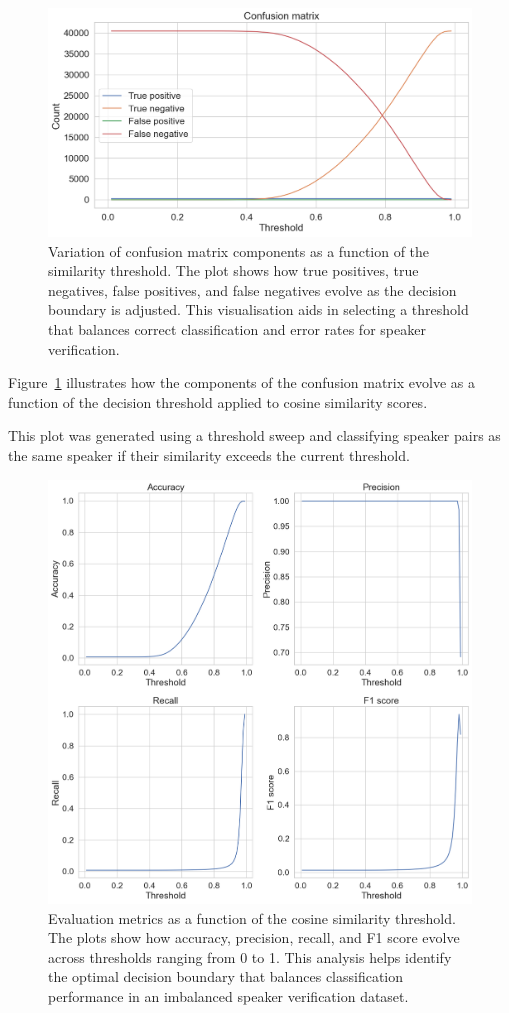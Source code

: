 \documentclass[conference]{IEEEtran}
\begin{document}
	
	\begin{figure}[H]
		\centering
		\includegraphics[width=0.7\linewidth]{img/img-confusion-matrix}
		\caption{Variation of confusion matrix components as a function of the similarity threshold. The plot shows how true positives, true negatives, false positives, and false negatives evolve as the decision boundary is adjusted. This visualisation aids in selecting a threshold that balances correct classification and error rates for speaker verification.}
		\label{fig:img-confusion-matrix}
	\end{figure}
	
	Figure~\ref{fig:img-confusion-matrix} illustrates how the components of the confusion matrix evolve as a function of the decision threshold applied to cosine similarity scores.
	
	This plot was generated using a threshold sweep and classifying speaker pairs as the same speaker if their similarity exceeds the current threshold.
	
	\begin{figure}[H]
		\centering
		\includegraphics[width=0.9\linewidth]{img/img-metrics}
		\caption{Evaluation metrics as a function of the cosine similarity threshold. The plots show how accuracy, precision, recall, and F1 score evolve across thresholds ranging from 0 to 1. This analysis helps identify the optimal decision boundary that balances classification performance in an imbalanced speaker verification dataset.}
		\label{fig:img-metrics}
	\end{figure}
	
\end{document}
